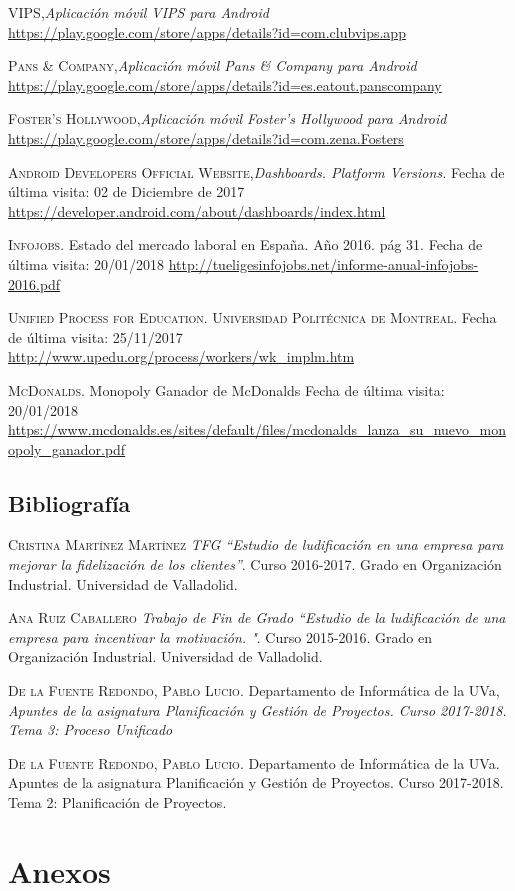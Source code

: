 \documentclass[twoside]{report}
\begin{document}
\begin{thebibliography}{a}
 \textsc{VIPS},\textit{Aplicación móvil VIPS para Android} \url{https://play.google.com/store/apps/details?id=com.clubvips.app}

 \textsc{Pans \& Company},\textit{Aplicación móvil Pans \& Company para Android} \url{https://play.google.com/store/apps/details?id=es.eatout.panscompany}

 \textsc{Foster's Hollywood},\textit{Aplicación móvil Foster's Hollywood para Android} \url{https://play.google.com/store/apps/details?id=com.zena.Fosters}

 \textsc{Android Developers Official Website},\textit{Dashboards. Platform Versions.} Fecha de última visita: 02 de Diciembre de 2017 \url{https://developer.android.com/about/dashboards/index.html}

 \textsc{Infojobs}. Estado del mercado laboral en España. Año 2016. pág 31. Fecha de última visita: 20/01/2018 \url{http://tueligesinfojobs.net/informe-anual-infojobs-2016.pdf} 

 \textsc{Unified Process for Education. Universidad Politécnica de Montreal}. Fecha de última visita: 25/11/2017 \url{http://www.upedu.org/process/workers/wk_implm.htm}

 \textsc{McDonalds}. Monopoly Ganador de McDonalds Fecha de última visita: 20/01/2018 \url{https://www.mcdonalds.es/sites/default/files/mcdonalds_lanza_su_nuevo_monopoly_ganador.pdf}



\section{Bibliografía}

 \textsc{Cristina Martínez Martínez} \textit{TFG “Estudio de ludificación en una empresa para mejorar la fidelización de los clientes”}. Curso 2016-2017. Grado en Organización Industrial. Universidad de Valladolid. 

 \textsc{Ana Ruiz Caballero} \textit{Trabajo de Fin de Grado “Estudio de la ludificación de una empresa para incentivar la motivación. "}. Curso 2015-2016. Grado en Organización Industrial. Universidad de Valladolid. 

 \textsc{De la Fuente Redondo, Pablo Lucio}. Departamento de Informática de la UVa, \textit{Apuntes de la asignatura Planificación y Gestión de Proyectos. Curso 2017-2018. Tema 3: Proceso Unificado}

 \textsc{De la Fuente Redondo, Pablo Lucio}. Departamento de Informática de la UVa. Apuntes de la asignatura Planificación y Gestión de Proyectos. Curso 2017-2018. Tema 2: Planificación de Proyectos.


\end{thebibliography}

\chapter{Anexos}
\end{document}
